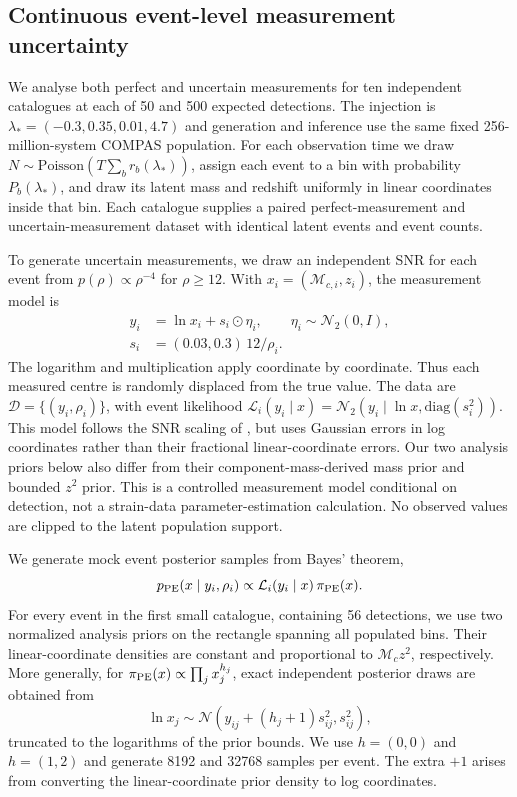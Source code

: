\subsection{Continuous event-level measurement uncertainty}\label{sec:continuous_measurements}
We analyse both perfect and uncertain measurements for ten independent
catalogues at each of 50 and 500 expected detections. The injection is
$\lambda_*=(-0.3,0.35,0.01,4.7)$ and generation and inference use the same
fixed 256-million-system COMPAS population. For each observation time we draw
$N\sim\mathrm{Poisson}(T\sum_b r_b(\lambda_*))$, assign each event to a bin
with probability $P_b(\lambda_*)$, and draw its latent mass and redshift
uniformly in linear coordinates inside that bin. Each catalogue supplies a
paired perfect-measurement and uncertain-measurement dataset with identical
latent events and event counts.

To generate uncertain measurements, we draw an independent SNR for each event
from $p(\rho)\propto\rho^{-4}$ for $\rho\geq12$. With
$x_i=(\mathcal M_{c,i},z_i)$, the measurement model is
\begin{align}
 y_i&=\ln x_i+s_i\odot\eta_i,\qquad\eta_i\sim\mathcal N_2(0,I),\\
 s_i&=(0.03,0.3)\,12/\rho_i.
\end{align}
The logarithm and multiplication apply coordinate by coordinate. Thus each
measured centre is randomly displaced from the true value. The data are
$\mathcal D=\{(y_i,\rho_i)\}$, with event likelihood
$\mathcal L_i(y_i\mid x)=\mathcal N_2(y_i\mid\ln x,\mathrm{diag}(s_i^2))$.
This model follows the SNR scaling of \citet[Section 3.2.2]{Riley:2023:ApJ},
but uses Gaussian errors in log coordinates rather than their fractional
linear-coordinate errors. Our two analysis priors below also differ from
their component-mass-derived mass prior and bounded $z^2$ prior.
This is a controlled measurement model conditional on detection, not a
strain-data parameter-estimation calculation. No observed values are clipped
to the latent population support.

We generate mock event posterior samples from Bayes' theorem,
\begin{equation}
 p_{\rm PE}(x\mid y_i,\rho_i)\propto
 \mathcal L_i(y_i\mid x)\,\pi_{\rm PE}(x).
\end{equation}
For every event in the first small catalogue, containing 56 detections, we
use two normalized analysis priors on the rectangle spanning all populated
bins. Their linear-coordinate densities are constant and proportional to
$\mathcal M_c z^2$, respectively. More generally, for
$\pi_{\rm PE}(x)\propto\prod_j x_j^{h_j}$, exact independent posterior draws
are obtained from
\begin{equation}
 \ln x_j\sim\mathcal N\!\left(y_{ij}+(h_j+1)s_{ij}^2,s_{ij}^2\right),
\end{equation}
truncated to the logarithms of the prior bounds. We use $h=(0,0)$ and
$h=(1,2)$ and generate 8192 and 32768 samples per event. The extra $+1$
arises from converting the linear-coordinate prior density to log coordinates.

